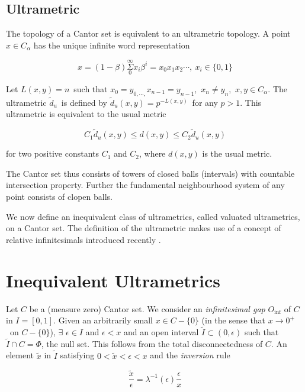 \documentclass[12pt]{article}
\begin{document}
\subsection{Ultrametric}

The topology of a Cantor set is equivalent to an ultrametric topology. A
point $x\in C_{\alpha }$ has the unique infinite word representation

$$x=(1-\beta )\underset{0}{\overset{\infty }{\Sigma }}x_{i}\beta ^{i} 
=x_{0}x_{1}x_{2}\cdots, \ x_{i}\in \{0,1\} $$


Let $L(x,y)=n$\, such that $x_{0}=y_{0,\cdots ,}x_{n-1}=y_{n-1},$ $x_{n}\neq
y_{n},$ $x,y\in C_{\alpha }.$
The ultrametric $\tilde d_{u}$\ is defined by $\tilde d_{u}(x,y)=p^{-L(x,y)}$\ for any $p>1.$
This ultrametric is equivalent to the usual metric

$$C_{1}\tilde d_{u}(x,y)\leq d(x,y)\leq C_{2}\tilde d_{u}(x,y)$$

\noindent  for two positive constants 
$C_{1}$ and $C_{2}$, where $d(x,y)$ is the usual metric.

\vspace{.25cm}

The Cantor set thus consists of towers of closed balls (intervals) with
countable intersection property. Further the fundamental neighbourhood
system of any point consists of clopen balls.

\vspace{.25cm}

We now define an inequivalent class of ultrametrics, called valuated
ultrametrics, on a Cantor set. The definition of the ultrametric makes use
of a concept of relative infinitesimals introduced recently \cite{sd1, sd2, ad}.

\section{Inequivalent Ultrametrics}

Let $C$ be a (measure zero) Cantor set. We consider an {\em infinitesimal gap} $
O_{\inf }$ of $C$ in $I=[0,1].$ Given an arbitrarily small $x\in C-\{0\}$ (in the sense that  $x\rightarrow 0^{+}$\ on $C-\{0\}$), $\exists $ $\epsilon \in I$ and $\epsilon<x$ and an open interval $\tilde I\subset (0,\epsilon)$ such that  $\tilde I\cap C=\Phi $, the null set. This follows from the total disconnectedness of $C$. An element $\tilde{x}$ in $\tilde I$ satisfying $0<\tilde{x}<\epsilon <x$ and the {\em inversion} rule

\begin{equation}\label{eq4}
\frac{\tilde{x}}{\epsilon }=\lambda ^{-1}(\epsilon )\frac{\epsilon }{x}
\end{equation}
\end{document}

